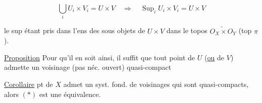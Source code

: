 \[
\bigcup_i U_i\times V_i=U\times V\quad\Longrightarrow\quad\mathop{\mathrm{Sup}}_i U_i\times V_i=U\times V
\]

le sup étant pris dans l'ens des sous objets de $U\times V$ dans le topos $\widetilde{O_X\times O_Y}$ (top $\pi$).

\uline{Proposition} \quad Pour qu'il en soit ainsi, il suffit que tout point de $U$ (\uline{ou} de $V$) admette un voisinage (pas néc. ouvert) quasi-compact

\uline{Corollaire} \quad {}  pt de $X$  admet un syst. fond. de voisinages qui sont quasi-compacts, alors $(*)$ est une équivalence.

